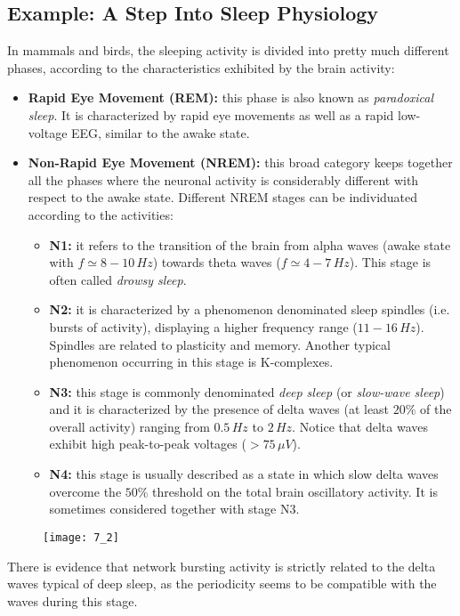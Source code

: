 \subsection{Example: A Step Into Sleep Physiology}
In mammals and birds, the sleeping activity is divided into pretty much different
phases, according to the characteristics exhibited by the brain activity:
\begin{itemize}
    \item \textbf{Rapid Eye Movement (REM):} this phase is also known as
          \textit{paradoxical sleep}. It is characterized by rapid eye movements
          as well as a rapid low-voltage EEG, similar to the awake state.
    \item \textbf{Non-Rapid Eye Movement (NREM):} this broad category keeps together
          all the phases where the neuronal activity is considerably different with
          respect to the awake state. Different NREM stages can be individuated
          according to the activities:
          \begin{itemize}
              \item \textbf{N1:} it refers to the transition of the brain from alpha
                    waves (awake state with \(f\simeq8-10\,Hz\)) towards theta waves
                    (\(f\simeq4-7\,Hz\)). This stage is often called \textit{drowsy sleep}.
              \item \textbf{N2:} it is characterized by a phenomenon denominated sleep
                    spindles (i.e. bursts of activity), displaying a higher frequency
                    range (\(11-16\,Hz\)). Spindles are related to plasticity and
                    memory. Another typical phenomenon occurring in this stage is
                    K-complexes.
              \item \textbf{N3:} this stage is commonly denominated
                    \textit{deep sleep} (or \textit{slow-wave sleep}) and it is
                    characterized by the presence of delta waves (at least \(20\%\)
                    of the overall activity) ranging from \(0.5\,Hz\) to \(2\,Hz\).
                    Notice that delta waves exhibit high peak-to-peak voltages
                    (\(>75\,\mu{V}\)).
              \item \textbf{N4:} this stage is usually described as a state in which slow
                    delta waves overcome the \(50\%\) threshold on the total brain
                    oscillatory activity. It is sometimes considered together with stage N3.
          \end{itemize}
\end{itemize}
\begin{figure}[H]
    \texttt{[image: 7\_2]}
    \centering
\end{figure}
There is evidence that network bursting activity is strictly related to the delta waves
typical of deep sleep, as the periodicity seems to be compatible with the waves
during this stage.

